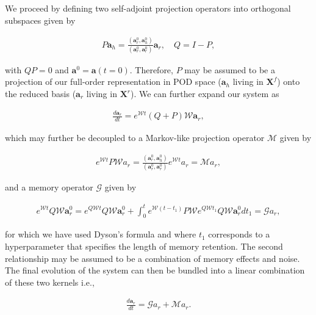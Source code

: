 \documentclass[preprint,12pt]{elsarticle}
\begin{document}
We proceed by defining two self-adjoint projection operators into orthogonal subspaces given by
\begin{linenomath*}
\begin{align}
P \textbf{a}_h = \frac{(\textbf{a}_r^0, \textbf{a}_h^0)}{(\textbf{a}_r^0,\textbf{a}_r^0)} \textbf{a}_r, \quad Q = I-P,
\end{align}
\end{linenomath*}
with $QP=0$ and $\textbf{a}^0 = \textbf{a} (t=0)$. Therefore, $P$ may be assumed to be a projection of our full-order representation in POD space ($\mathbf{a}_h$ living in $\textbf{X}^f$) onto the reduced basis ($\mathbf{a}_r$ living in $\mathbf{X}^r$). We can further expand our system as 
\begin{linenomath*}
\begin{align}
\frac{d \textbf{a}_r}{d t} = e^{\mathcal{W} t} (Q+P) \mathcal{W} \mathbf{a}_{r},
\end{align}
\end{linenomath*}
which may further be decoupled to a Markov-like projection operator $\mathcal{M}$ given by 
\begin{linenomath*}
\begin{align}
e^{\mathcal{W} t} P \mathcal{W} a_r =  \frac{(\textbf{a}_r^0, \textbf{a}_h^0)}{(\textbf{a}_r^0,\textbf{a}_r^0)} e^{\mathcal{W} t} a_r = \mathcal{M} a_r,
\end{align}
\end{linenomath*}
and a memory operator $\mathcal{G}$ given by
\begin{linenomath*}
\begin{align}
e^{\mathcal{W} t} Q \mathcal{W} \mathbf{a}_r^0 = e^{Q \mathcal{W} t} Q \mathcal{W} \mathbf{a}_r^0 + \int_{0}^{t} e^{\mathcal{W}\left(t-t_{1}\right)} P \mathcal{W} e^{Q \mathcal{W} t_{1}} Q \mathcal{W} \mathbf{a}_r^0 d t_{1} = \mathcal{G} a_r,
\end{align}
\end{linenomath*}
for which we have used Dyson's formula \cite{evans2008statistical} and where $t_1$ corresponds to a hyperparameter that specifies the length of memory retention. The second relationship may be assumed to be a combination of memory effects and noise. The final evolution of the system can then be bundled into a linear combination of these two kernels i.e.,
\begin{linenomath*}
\begin{align}
\frac{d \textbf{a}_r}{d t} = \mathcal{G} a_r + \mathcal{M} a_r.
\end{align}
\end{linenomath*}
\end{document}
